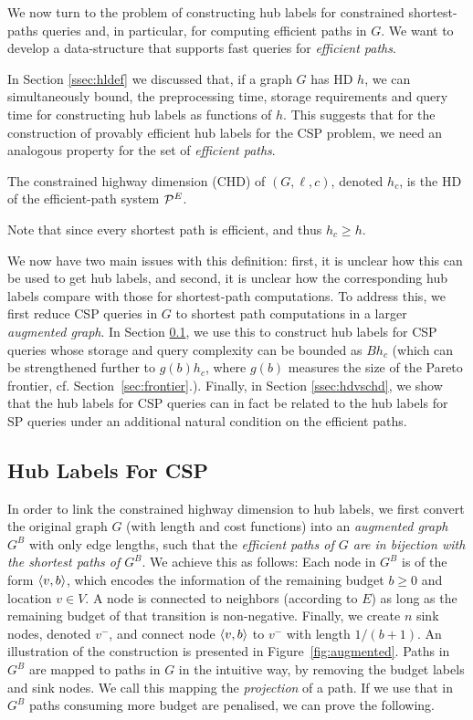 We now turn to the problem of constructing hub labels for constrained shortest-paths queries and, in particular, for computing efficient paths in $G$. 
We want to develop a data-structure that supports fast queries for \emph{efficient paths}. 

In Section \ref{ssec:hldef} we discussed that, if a graph $G$ has HD $h$, we can simultaneously bound, the preprocessing time, storage requirements and query time for constructing hub labels as functions of $h$.
This suggests that for the construction of provably efficient hub labels for the CSP problem, we need an analogous property for the set of \emph{efficient paths}.
\begin{definition} The constrained highway dimension (CHD) of $(G,\ell,c)$, denoted $h_c$, is the HD of the efficient-path system $\mathcal{P}^E$.
\end{definition}
\noindent Note that since every shortest path is efficient, and thus $h_c\geq h$.

We now have two main issues with this definition: first, it is unclear how this can be used to get hub labels, and second, it is unclear how the corresponding hub labels compare with those for shortest-path computations. 
To address this, we first reduce CSP queries in $G$ to shortest path computations in a larger \emph{augmented graph}. 
In Section \ref{ssec:aug}, we use this to construct hub labels for CSP queries whose storage and query complexity can be bounded as $Bh_c$ (which can be strengthened further to $g(b)h_c$, where $g(b)$ measures the size of the Pareto frontier, cf. Section~\ref{sec:frontier}.). 
Finally, in Section \ref{ssec:hdvschd}, we show that the hub labels for CSP queries can in fact be related to the hub labels for SP queries under an additional natural condition on the efficient paths.

\subsection{Hub Labels For CSP}
\label{ssec:aug}

In order to link the constrained highway dimension to hub labels, we first convert the original graph $G$ (with length and cost functions) into an \emph{augmented graph} $G^B$ with only edge lengths, such that the \emph{efficient paths of $G$ are in bijection with the shortest paths of $G^B$}.
We achieve this as follows: Each node in $G^B$ is of the form $\langle v,b\rangle$, which encodes the information of the remaining budget $b\geq 0$ and location $v\in V$.
A node is connected to neighbors (according to $E$) as long as the remaining budget of that transition is non-negative.
Finally, we create $n$ sink nodes, denoted $v^-$, and connect node $\langle v,b\rangle$ to $v^-$ with length $1/(b+1)$.
An illustration of the construction is presented in Figure~\ref{fig:augmented}.
Paths in $G^B$ are mapped to paths in $G$ in the intuitive way, by removing the budget labels and sink nodes.
We call this mapping the \emph{projection} of a path.
If we use that in $G^B$ paths consuming more budget are penalised, we can prove the following.

